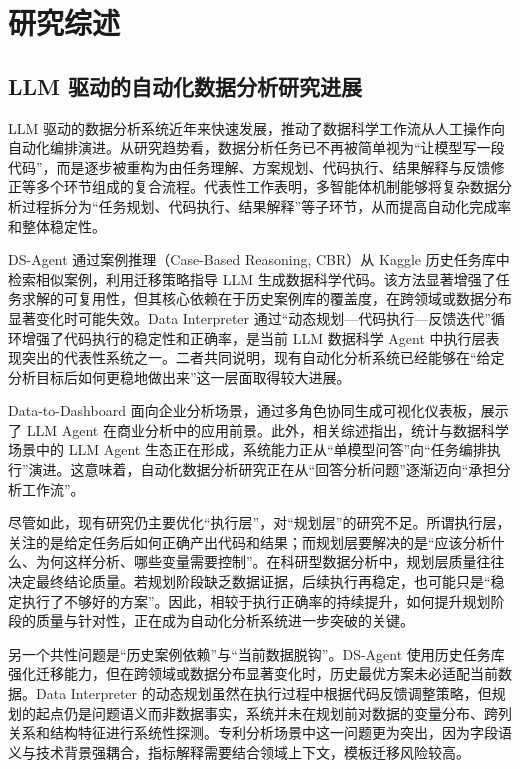 \section{研究综述}

\subsection{LLM 驱动的自动化数据分析研究进展}

LLM 驱动的数据分析系统近年来快速发展，推动了数据科学工作流从人工操作向自动化编排演进\cite{sun2025survey,zhao2024llm}。从研究趋势看，数据分析任务已不再被简单视为“让模型写一段代码”，而是逐步被重构为由任务理解、方案规划、代码执行、结果解释与反馈修正等多个环节组成的复合流程。代表性工作表明，多智能体机制能够将复杂数据分析过程拆分为“任务规划、代码执行、结果解释”等子环节，从而提高自动化完成率和整体稳定性。

DS-Agent\cite{guo2024dsagent} 通过案例推理（Case-Based Reasoning, CBR）从 Kaggle 历史任务库中检索相似案例，利用迁移策略指导 LLM 生成数据科学代码。该方法显著增强了任务求解的可复用性，但其核心依赖在于历史案例库的覆盖度，在跨领域或数据分布显著变化时可能失效。Data Interpreter\cite{hong2025data} 通过“动态规划—代码执行—反馈迭代”循环增强了代码执行的稳定性和正确率，是当前 LLM 数据科学 Agent 中执行层表现突出的代表性系统之一。二者共同说明，现有自动化分析系统已经能够在“给定分析目标后如何更稳地做出来”这一层面取得较大进展。

Data-to-Dashboard\cite{zhang2025data} 面向企业分析场景，通过多角色协同生成可视化仪表板，展示了 LLM Agent 在商业分析中的应用前景。此外，相关综述指出，统计与数据科学场景中的 LLM Agent 生态正在形成，系统能力正从“单模型问答”向“任务编排执行”演进\cite{sun2025survey}。这意味着，自动化数据分析研究正在从“回答分析问题”逐渐迈向“承担分析工作流”。

尽管如此，现有研究仍主要优化“执行层”，对“规划层”的研究不足。所谓执行层，关注的是给定任务后如何正确产出代码和结果；而规划层要解决的是“应该分析什么、为何这样分析、哪些变量需要控制”。在科研型数据分析中，规划层质量往往决定最终结论质量。若规划阶段缺乏数据证据，后续执行再稳定，也可能只是“稳定执行了不够好的方案”。因此，相较于执行正确率的持续提升，如何提升规划阶段的质量与针对性，正在成为自动化分析系统进一步突破的关键。

另一个共性问题是“历史案例依赖”与“当前数据脱钩”。DS-Agent 使用历史任务库强化迁移能力，但在跨领域或数据分布显著变化时，历史最优方案未必适配当前数据。Data Interpreter 的动态规划虽然在执行过程中根据代码反馈调整策略，但规划的起点仍是问题语义而非数据事实，系统并未在规划前对数据的变量分布、跨列关系和结构特征进行系统性探测。专利分析场景中这一问题更为突出，因为字段语义与技术背景强耦合，指标解释需要结合领域上下文，模板迁移风险较高。

